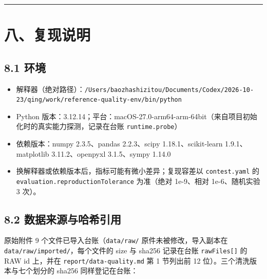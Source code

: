 \documentclass[
  11pt,
]{ctexart}
\providecommand{\tightlist}{%
  \setlength{\itemsep}{0pt}\setlength{\parskip}{0pt}}
\begin{document}
\begin{center}\rule{0.5\linewidth}{0.5pt}\end{center}

\section{八、复现说明}\label{ux516bux590dux73b0ux8bf4ux660e}

\subsection{8.1 环境}\label{ux73afux5883}

\begin{itemize}
\tightlist
\item
  解释器（绝对路径）：\texttt{/\allowbreak{}Users/\allowbreak{}baozhashizitou/\allowbreak{}Documents/\allowbreak{}Codex/\allowbreak{}2026-10-23/\allowbreak{}qing/\allowbreak{}work/\allowbreak{}reference-quality-env/\allowbreak{}bin/\allowbreak{}python}
\item
  Python
  版本：3.12.14；平台：macOS-27.0-arm64-arm-64bit（来自项目初始化时的真实能力探测，记录在台账
  \texttt{runtime.probe}）
\item
  依赖版本：numpy 2.3.5、pandas 2.2.3、scipy 1.18.1、scikit-learn
  1.9.1、matplotlib 3.11.2、openpyxl 3.1.5、sympy 1.14.0
\item
  换解释器或依赖版本后，指标可能有微小差异；复现容差以
  \texttt{contest.yaml} 的 \texttt{evaluation.\allowbreak{}reproductionTolerance}
  为准（绝对 1e-9、相对 1e-6、随机实验 3 次）。
\end{itemize}

\subsection{8.2
数据来源与哈希引用}\label{ux6570ux636eux6765ux6e90ux4e0eux54c8ux5e0cux5f15ux7528}

原始附件 9 个文件已导入台账（\texttt{data/raw/} 原件未被修改，导入副本在
\texttt{data/\allowbreak{}raw/\allowbreak{}imported/\allowbreak{}}，每个文件的 size 与 sha256 记录在台账
\texttt{rawFiles{[}{]}} 的 RAW id 上，并在
\texttt{report/\allowbreak{}data-quality.\allowbreak{}md} 第 1 节列出前 12
位）。三个清洗版本与七个划分的 sha256 同样登记在台账：
\end{document}
